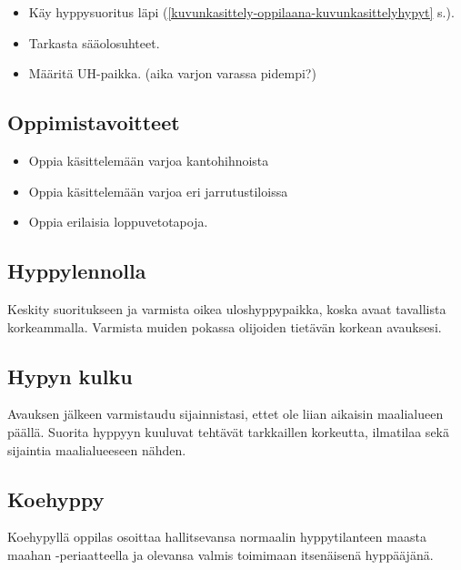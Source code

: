 \begin{multicols}{2}
\begin{itemize}
\item  Käy hyppysuoritus läpi (\ref{kuvunkasittely-oppilaana-kuvunkasittelyhypyt} s.\pageref{kuvunkasittely-oppilaana-kuvunkasittelyhypyt}). 
\item  Tarkasta sääolosuhteet. 
\item  Määritä UH-paikka. (aika varjon varassa pidempi?) 
\end{itemize}
\subsection{ Oppimistavoitteet }
\label{jatkokoulutuksen-suoritukset-oppimistavoitteet}

\begin{itemize}
\item  Oppia käsittelemään varjoa kantohihnoista 
\item  Oppia käsittelemään varjoa eri jarrutustiloissa 
\item  Oppia erilaisia loppuvetotapoja. 
\end{itemize}
\subsection{ Hyppylennolla }
\label{jatkokoulutuksen-suoritukset-hyppylennolla}


Keskity suoritukseen ja varmista oikea uloshyppypaikka, koska avaat tavallista korkeammalla. Varmista muiden pokassa olijoiden tietävän korkean avauksesi. 

\subsection{ Hypyn kulku }
\label{jatkokoulutuksen-suoritukset-hypyn-kulku}


Avauksen jälkeen varmistaudu sijainnistasi, ettet ole liian aikaisin maalialueen päällä. Suorita hyppyyn kuuluvat tehtävät tarkkaillen korkeutta, ilmatilaa sekä sijaintia maalialueeseen nähden. 


\end{multicols}\pagebreak\begin{multicols}{2} 

\section{ Koehyppy }
\label{jatkokoulutuksen-suoritukset-koehyppy}


Koehypyllä oppilas osoittaa hallitsevansa normaalin hyppytilanteen maasta maahan -periaatteella ja olevansa valmis toimimaan itsenäisenä hyppääjänä. 


\end{multicols}
